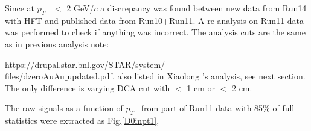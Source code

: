 \clearpage

\newcommand{\ttbs}{\char'134}
\newcommand{\pt}{$p_{T}$ }
\newcommand{ \bfg }{\begin{figure}[]}
\newcommand{ \efg }{\end{figure}}
\newcommand{\dzero}{$D^{0}$ }




Since at \pt\ $<$ 2 GeV/$c$ a discrepancy was found between new data from Run14 with HFT and published data from Run10+Run11. A re-analysis on Run11 data was performed to check if anything was incorrect. The analysis cuts are the same as in previous analysis note:

https://drupal.star.bnl.gov/STAR/system/ \\

files/dzeroAuAu$\_$updated.pdf, also listed in Xiaolong 's analysis, see next section. The only difference is varying DCA cut with $<$ 1 cm or $<$ 2 cm.

The raw signals as a function of \pt\ from part of Run11 data with 85\% of full statistics were extracted as Fig.\ref{D0inpt1},

